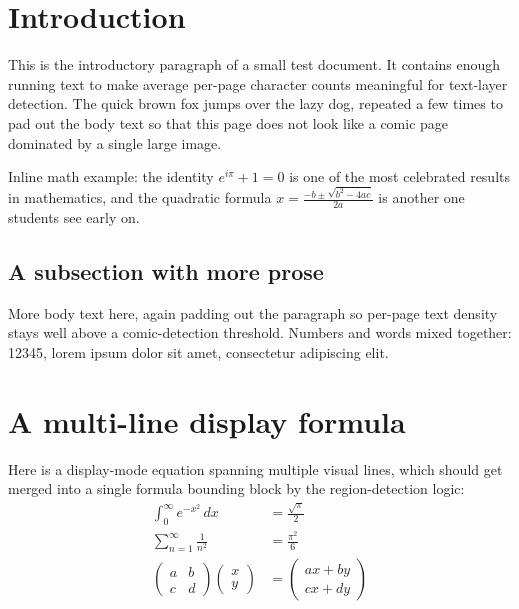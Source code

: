 \documentclass[11pt]{article}
\begin{document}
\section{Introduction}

This is the introductory paragraph of a small test document. It contains enough running
text to make average per-page character counts meaningful for text-layer detection. The
quick brown fox jumps over the lazy dog, repeated a few times to pad out the body text so
that this page does not look like a comic page dominated by a single large image.

Inline math example: the identity $e^{i\pi} + 1 = 0$ is one of the most celebrated results
in mathematics, and the quadratic formula $x = \frac{-b \pm \sqrt{b^2-4ac}}{2a}$ is another
one students see early on.

\subsection{A subsection with more prose}

More body text here, again padding out the paragraph so per-page text density stays well
above a comic-detection threshold. Numbers and words mixed together: 12345, lorem ipsum
dolor sit amet, consectetur adipiscing elit.

\clearpage
\section{A multi-line display formula}

Here is a display-mode equation spanning multiple visual lines, which should get merged
into a single formula bounding block by the region-detection logic:
\begin{align*}
  \int_0^\infty e^{-x^2}\,dx &= \frac{\sqrt{\pi}}{2} \\
  \sum_{n=1}^{\infty} \frac{1}{n^2} &= \frac{\pi^2}{6} \\
  \begin{pmatrix} a & b \\ c & d \end{pmatrix}
  \begin{pmatrix} x \\ y \end{pmatrix}
  &=
  \begin{pmatrix} ax+by \\ cx+dy \end{pmatrix}
\end{align*}
\end{document}
